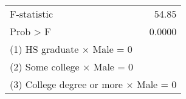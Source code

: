 \begin{tabular}{lr}
\toprule
F-statistic &     54.85 \\
Prob > F &    0.0000 \\
\bottomrule
\multicolumn{2}{l}{\footnotesize (1) HS graduate $\times$ Male = 0}\\
\multicolumn{2}{l}{\footnotesize (2) Some college $\times$ Male = 0}\\
\multicolumn{2}{l}{\footnotesize (3) College degree or more $\times$ Male = 0}\\
\end{tabular}
